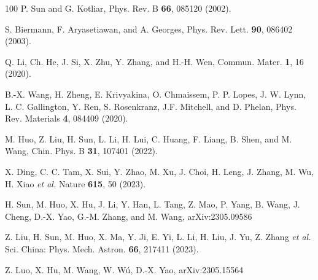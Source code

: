 \documentclass[prl,twocolumn,preprintnumbers,superscriptaddress]{revtex4-1}
\begin{document}
\begin{thebibliography}{100}
P. Sun and G. Kotliar, Phys. Rev. B \textbf{66}, 085120 (2002).

S. Biermann, F. Aryasetiawan, and A. Georges, Phys. Rev. Lett. \textbf{90}, 086402 (2003).


Q. Li, Ch. He, J. Si, X. Zhu, Y. Zhang, and H.-H. Wen, Commun. Mater. \textbf{1}, 16 (2020).

B.-X. Wang, H. Zheng, E. Krivyakina, O. Chmaissem, P. P. Lopes, J. W. Lynn, L. C. Gallington, Y. Ren, S. Rosenkranz, J.F. Mitchell, and D. Phelan, Phys. Rev. Materials \textbf{4}, 084409 (2020).

M. Huo, Z. Liu, H. Sun, L. Li, H. Lui, C. Huang, F. Liang, B. Shen, and M. Wang, Chin. Phys. B \textbf{31}, 107401 (2022).


X. Ding, C. C. Tam, X. Sui, Y. Zhao, M. Xu, J. Choi, H. Leng, J. Zhang, M. Wu, H. Xiao \emph{et al.}
Nature \textbf{615}, 50 (2023).

H. Sun, M. Huo, X. Hu, J. Li, Y. Han, L. Tang, Z. Mao, P. Yang, B. Wang, J. Cheng, D.-X. Yao, G.-M. Zhang, and M. Wang, arXiv:2305.09586

Z. Liu, H. Sun, M. Huo, X. Ma, Y. Ji, E. Yi, L. Li, H. Liu, J. Yu, Z. Zhang \emph{et al.}
Sci. China: Phys. Mech. Astron. \textbf{66}, 217411 (2023).

Z. Luo, X. Hu, M. Wang, W. W\'u, D.-X. Yao, arXiv:2305.15564


\end{thebibliography}
\end{document}
